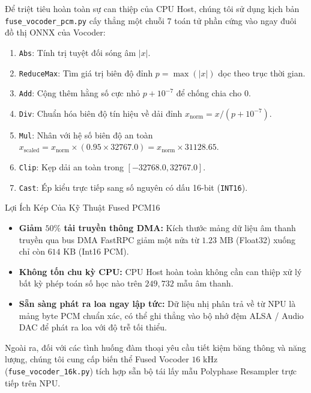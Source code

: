 \documentclass[11pt,a4paper,oneside,table]{report}
\begin{document}
Để triệt tiêu hoàn toàn sự can thiệp của CPU Host, chúng tôi sử dụng kịch bản \texttt{fuse\_vocoder\_pcm.py} cấy thẳng một chuỗi 7 toán tử phần cứng vào ngay đuôi đồ thị ONNX của Vocoder:
\begin{enumerate}
    \item \texttt{Abs}: Tính trị tuyệt đối sóng âm $|x|$.
    \item \texttt{ReduceMax}: Tìm giá trị biên độ đỉnh $p = \max(|x|)$ dọc theo trục thời gian.
    \item \texttt{Add}: Cộng thêm hằng số cực nhỏ $p + 10^{-7}$ để chống chia cho 0.
    \item \texttt{Div}: Chuẩn hóa biên độ tín hiệu về dải đỉnh $x_{\text{norm}} = x / (p + 10^{-7})$.
    \item \texttt{Mul}: Nhân với hệ số biên độ an toàn $x_{\text{scaled}} = x_{\text{norm}} \times (0.95 \times 32767.0) = x_{\text{norm}} \times 31128.65$.
    \item \texttt{Clip}: Kẹp dải an toàn trong $[-32768.0, 32767.0]$.
    \item \texttt{Cast}: Ép kiểu trực tiếp sang số nguyên có dấu 16-bit (\texttt{INT16}).
\end{enumerate}

\begin{technicalbox}{Lợi Ích Kép Của Kỹ Thuật Fused PCM16}
\begin{itemize}
    \item \textbf{Giảm $50\%$ tải truyền thông DMA:} Kích thước mảng dữ liệu âm thanh truyền qua bus DMA FastRPC giảm một nửa từ $1.23\text{ MB}$ (Float32) xuống chỉ còn $614\text{ KB}$ (Int16 PCM).
    \item \textbf{Không tốn chu kỳ CPU:} CPU Host hoàn toàn không cần can thiệp xử lý bất kỳ phép toán số học nào trên $249,732$ mẫu âm thanh.
    \item \textbf{Sẵn sàng phát ra loa ngay lập tức:} Dữ liệu nhị phân trả về từ NPU là mảng byte PCM chuẩn xác, có thể ghi thẳng vào bộ nhớ đệm ALSA / Audio DAC để phát ra loa với độ trễ tối thiểu.
\end{itemize}
\end{technicalbox}

Ngoài ra, đối với các tình huống đàm thoại yêu cầu tiết kiệm băng thông và năng lượng, chúng tôi cung cấp biến thể Fused Vocoder $16\text{ kHz}$ (\texttt{fuse\_vocoder\_16k.py}) tích hợp sẵn bộ tái lấy mẫu Polyphase Resampler trực tiếp trên NPU.
\end{document}

